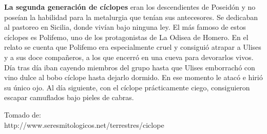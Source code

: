 \textbf{La segunda generación de cíclopes} eran los descendientes de Poseidón y no poseían la habilidad para la metalurgia que tenían sus antecesores. Se dedicaban al pastoreo en Sicilia, donde vivían bajo ninguna ley.
El más famoso de estos cíclopes es Polifemo, uno de los protagonistas de La Odisea de Homero. En el relato se cuenta que Polifemo era especialmente cruel y consiguió atrapar a Ulises y a sus doce compañeros, a los que encerró en una cueva para devorarlos vivos. Día tras día iban cayendo miembros del grupo hasta que Ulises emborrachó con vino dulce al bobo cíclope hasta dejarlo dormido. En ese momento le atacó e hirió su único ojo. Al día siguiente, con el cíclope prácticamente ciego, consiguieron escapar camuflados bajo pieles de cabras. \begin{flushright}
{\footnotesize Tomado de:\\ http://www.seresmitologicos.net/terrestres/ciclope}
\end{flushright}
